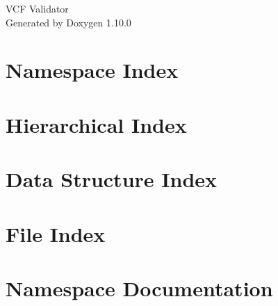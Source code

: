 \documentclass[twoside]{book}
\newcommand{\+}{\discretionary{\mbox{\scriptsize$\hookleftarrow$}}{}{}}
\newcommand{\clearemptydoublepage}{%
    \newpage{\pagestyle{empty}\cleardoublepage}%
  }
\begin{document}
  \raggedbottom
    \hypersetup{pageanchor=false,
                bookmarksnumbered=true,
                pdfencoding=unicode
               }
  \begin{titlepage}
  \vspace*{7cm}
  \begin{center}%
  {\Large VCF Validator}\\
  \vspace*{1cm}
  {\large Generated by Doxygen 1.10.0}\\
  \end{center}
  \end{titlepage}
  \clearemptydoublepage
  \tableofcontents
  \clearemptydoublepage
  \hypersetup{pageanchor=true}





\chapter{Namespace Index}

\chapter{Hierarchical Index}

\chapter{Data Structure Index}

\chapter{File Index}

\chapter{Namespace Documentation}

\end{document}
